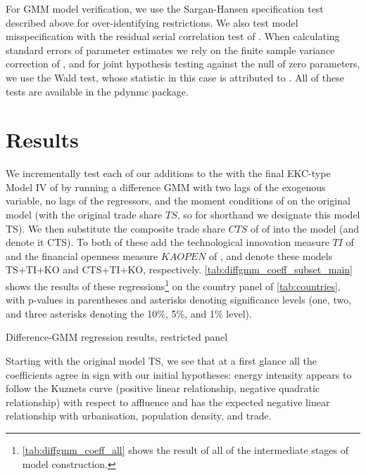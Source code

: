 \documentclass[12pt,a4paper]{article}
\newcommand{\pkg}[1]{{\fontseries{b}\selectfont #1}}
\begin{document}
For GMM model verification, we use the Sargan-Hansen specification test described above for over-identifying restrictions. 
We also test model misspecification with the residual serial correlation test of \cite{arellanoTestsSpecificationPanel1991}.
When calculating standard errors of parameter estimates we rely on the finite sample variance correction of \cite{windmeijerFiniteSampleCorrection2005}, and for joint hypothesis testing against the null of zero parameters, we use the Wald test, whose statistic in this case is attributed to \cite{hayashiEconometrics2000}.
All of these tests are available in the \pkg{pdynmc} package.

\section{Results}\label{sec:results}

We incrementally test each of our additions to the with the final EKC-type Model IV of \cite{rafiqUrbanizationOpennessEmissions2016} by running a difference GMM with two lags of the exogenous variable, no lags of the regressors, and the moment conditions of \cite{arellanoTestsSpecificationPanel1991} on the original model (with the original trade share $TS$, so for shorthand we designate this model TS).
We then substitute the composite trade share $CTS$ of of \cite{squalliNewMeasureTrade2011} into the model (and denote it CTS).
To both of these add the technological innovation measure $TI$ of \cite{maradanaDoesInnovationPromote2017} and the financial openness measure $KAOPEN$ of \citep{chinnWhatMattersFinancial2006}, and denote these models TS+TI+KO and CTS+TI+KO, respectively.
\cref{tab:diffgmm_coeff_subset_main} shows the results of these regressions\footnote{
\cref{tab:diffgmm_coeff_all} shows the result of all of the intermediate stages of model construction.
} on the country panel of \cref{tab:countries}, with p-values in parentheses and asterisks denoting significance levels (one, two, and three asterisks  denoting the 10\%, 5\%, and 1\% level).

\renewcommand{\arraystretch}{3}
\begin{table}[htbp]
\centering

\caption{Difference-GMM regression results, restricted panel}
\label{tab:diffgmm_coeff_subset_main}
\end{table}
\renewcommand{\arraystretch}{1}

Starting with the original model TS, we see that at a first glance all the coefficients agree in sign with our initial hypotheses: energy intensity appears to follow the Kuznets curve (positive linear relationship, negative quadratic relationship) with respect to affluence and has the expected negative linear relationship with urbanisation, population density, and trade.
\end{document}
